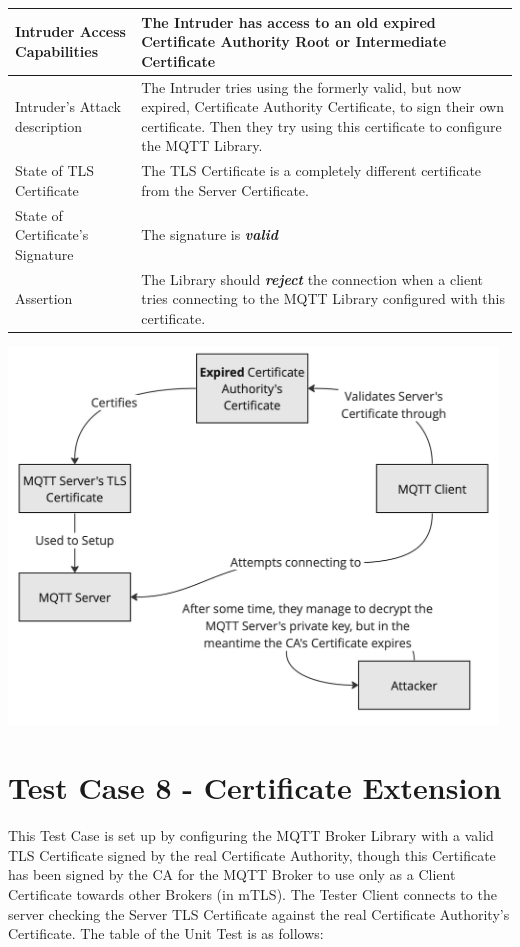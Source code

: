 \documentclass[binding=0.6cm,noexaminfo]{sapthesis}
\begin{document}
\begin{center}
\begin{tabular}{| p{6cm} | p{6cm} |}
\hline
Intruder Access Capabilities & The Intruder has access to an old expired Certificate Authority Root or Intermediate Certificate \\
\hline
Intruder’s Attack description & The Intruder tries using the formerly valid, but now expired, Certificate Authority Certificate, to sign their own certificate. Then they try using this certificate to configure the MQTT Library. \\
\hline
State of TLS Certificate & The TLS Certificate is a completely different certificate from the Server Certificate. \\
\hline
State of Certificate’s Signature & The signature is \textbf{\textit{valid}} \\
\hline
Assertion & The Library should \textbf{\textit{reject}} the connection when a client tries connecting to the MQTT Library configured with this certificate. \\
\hline
\end{tabular}
\end{center}

\includegraphics[width=13cm]{TC7}

\section{Test Case 8 - Certificate Extension}
This Test Case is set up by configuring the MQTT Broker Library with a valid TLS Certificate signed by the real Certificate Authority, though this Certificate has been signed by the CA for the MQTT Broker to use only as a Client Certificate towards other Brokers (in mTLS). The Tester Client connects to the server checking the Server TLS Certificate against the real Certificate Authority’s Certificate. The table of the Unit Test is as follows:
\end{document}
